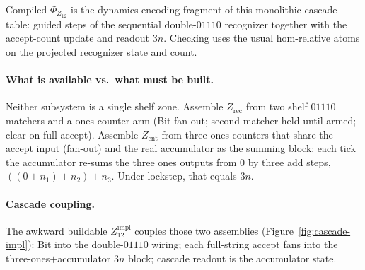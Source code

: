 Compiled $\Phi_{Z_{12}}$ is the dynamics-encoding fragment of this monolithic cascade table: guided steps of the sequential double-$01110$ recognizer together with the accept-count update and readout $3n$. Checking uses the usual hom-relative atoms on the projected recognizer state and count.

\paragraph{What is available vs.\ what must be built.}
Neither subsystem is a single shelf zone. Assemble $Z_{\mathrm{rec}}$ from two shelf $01110$ matchers and a ones-counter arm (Bit fan-out; second matcher held until armed; clear on full accept). Assemble $Z_{\mathrm{cnt}}$ from three ones-counters that share the accept input (fan-out) and the real accumulator as the summing block: each tick the accumulator re-sums the three ones outputs from $0$ by three add steps, $((0{+}n_1){+}n_2){+}n_3$. Under lockstep, that equals $3n$.

\paragraph{Cascade coupling.}
The awkward buildable $Z_{12}^{\mathrm{impl}}$ couples those two assemblies (Figure~\ref{fig:cascade-impl}): Bit into the double-$01110$ wiring; each full-string accept fans into the three-ones$+$accumulator $3n$ block; cascade readout is the accumulator state.

